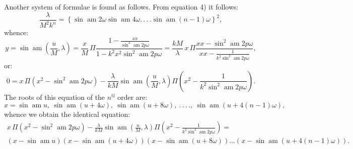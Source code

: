 \documentclass{article}
\begin{document}
Another system of formulae is found as follows. From equation 4) it follows:
\[
\frac{\lambda}{M^{2}k^{n}}=\left\{\sin\operatorname{am}2\omega\sin\operatorname{am}4\omega.\,.\,.\,.\sin\operatorname{am}(n-1)\omega\right\}^{2},
\]
whence:
\[
y=\sin\operatorname{am}\left(\frac{u}{M},\lambda\right)=\frac{x}{M}\,\Pi\frac{1-\frac{xx}{\sin^{2}\operatorname{am}2p\omega}}{1-k^{2}x^{2}\sin^{2}\operatorname{am}2p\omega}=\frac{kM}{\lambda}\,x\,\Pi\frac{xx-\sin^{2}\operatorname{am}2p\omega}{xx-\frac{1}{k^{2}\sin^{2}\operatorname{am}2p\omega}},
\]
or:
\[
0=x\,\Pi\left(x^{2}-\sin^{2}\operatorname{am}2p\omega\right)-\frac{\lambda}{kM}\sin\operatorname{am}\left(\frac{u}{M},\lambda\right)\Pi\left(x^{2}-\frac{1}{k^{2}\sin^{2}\operatorname{am}2p\omega}\right).
\]
The roots of this equation of the $n^{\mathrm{ti}}$ order are:
\[
x=\sin\operatorname{am}u,\ \sin\operatorname{am}(u+4\omega),\ \sin\operatorname{am}(u+8\omega),\ .\,.\,.\,.,\ \sin\operatorname{am}(u+4(n-1)\omega),
\]
whence we obtain the identical equation:
\[
\begin{gathered}
x\,\Pi\left(x^{2}-\sin^{2}\operatorname{am}2p\omega\right)-\frac{\lambda}{kM}\sin\operatorname{am}\left(\frac{u}{M},\lambda\right)\Pi\left(x^{2}-\frac{1}{k^{2}\sin^{2}\operatorname{am}2p\omega}\right)=\\[1.5ex]
\left(x-\sin\operatorname{am}u\right)\left(x-\sin\operatorname{am}(u+4\omega)\right)\left(x-\sin\operatorname{am}(u+8\omega)\right)\ldots\left(x-\sin\operatorname{am}(u+4(n-1)\omega)\right).
\end{gathered}
\]
\end{document}
